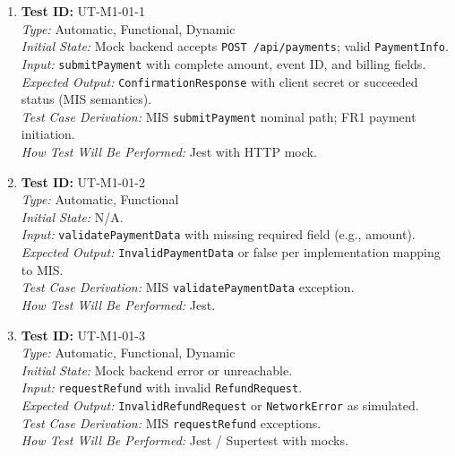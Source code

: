 \documentclass[12pt, titlepage]{article}
\begin{document}
\begin{enumerate}\setlength{\itemsep}{0.85em}
    \item \textbf{Test ID:} UT-M1-01-1\\[0.25em]
    \textit{Type:} Automatic, Functional, Dynamic\\
    \textit{Initial State:} Mock backend accepts \texttt{POST /api/payments}; valid \texttt{PaymentInfo}.\\
    \textit{Input:} \texttt{submitPayment} with complete amount, event ID, and billing fields.\\
    \textit{Expected Output:} \texttt{ConfirmationResponse} with client secret or succeeded status (MIS semantics).\\
    \textit{Test Case Derivation:} MIS \texttt{submitPayment} nominal path; FR1 payment initiation.\\
    \textit{How Test Will Be Performed:} Jest with HTTP mock.

    \item \textbf{Test ID:} UT-M1-01-2\\[0.25em]
    \textit{Type:} Automatic, Functional\\
    \textit{Initial State:} N/A.\\
    \textit{Input:} \texttt{validatePaymentData} with missing required field (e.g., amount).\\
    \textit{Expected Output:} \texttt{InvalidPaymentData} or false per implementation mapping to MIS.\\
    \textit{Test Case Derivation:} MIS \texttt{validatePaymentData} exception.\\
    \textit{How Test Will Be Performed:} Jest.

    \item \textbf{Test ID:} UT-M1-01-3\\[0.25em]
    \textit{Type:} Automatic, Functional, Dynamic\\
    \textit{Initial State:} Mock backend error or unreachable.\\
    \textit{Input:} \texttt{requestRefund} with invalid \texttt{RefundRequest}.\\
    \textit{Expected Output:} \texttt{InvalidRefundRequest} or \texttt{NetworkError} as simulated.\\
    \textit{Test Case Derivation:} MIS \texttt{requestRefund} exceptions.\\
    \textit{How Test Will Be Performed:} Jest / Supertest with mocks.
\end{enumerate}
\end{document}
